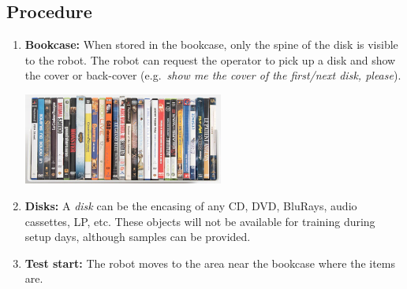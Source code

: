 \subsection*{Procedure}
\begin{enumerate}[nosep]
	\item \textbf{Bookcase:} When stored in the bookcase, only the spine of the disk is visible to the robot. The robot can request the operator to pick up a disk and show the cover or back-cover (e.g.~\textit{show me the cover of the first/next disk, please}).
	
		\begin{center}
	\includegraphics[width=\textwidth,height=3cm,keepaspectratio]{images/find_my_disk.png}
	\end{center}
	
	\item \textbf{Disks:} A \textit{disk} can be the encasing of any CD, DVD, BluRays, audio cassettes, LP, etc. These objects will not be available for training during setup days, although samples can be provided.
	\item \textbf{Test start:} The robot moves to the area near the bookcase where the items are.
\end{enumerate}

%
%
